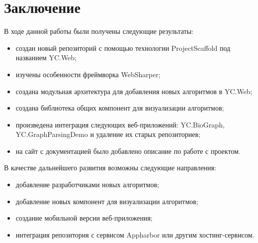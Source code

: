 \documentclass[14pt]{matmex-diploma-custom}
\begin{document}
\section*{Заключение}
В ходе данной работы были получены следующие результаты:
\begin{itemize}
    \item создан новый репозиторий с помощью технологии \linebreak ProjectScaffold под названием YC.Web;
    \item изучены особенности фреймворка WebSharper;
    \item создана модульная архитектура для добавления новых алгоритмов в YC.Web;
    \item создана библиотека общих компонент для визуализации алгоритмов;
    \item произведена интеграция следующих веб-приложений: 
        \linebreak YC.BioGraph, YC.GraphParsingDemo и удаление их старых репозиториев;
    \item на сайт с документацией было добавлено описание по работе с проектом.
\end{itemize}

В качестве дальнейшего развития возможны следующие направления: 

\begin{itemize}
    \item добавление разработчиками новых алгоритмов; 
    \item добавление новых компонент для визуализации алгоритмов;
    \item создание мобильной версии веб-приложения;
    \item интеграция репозитория с сервисом Appharbor или другим хостинг-сервисом.
\end{itemize}


\setmonofont[Mapping=tex-text]{CMU Typewriter Text}


\end{document}
